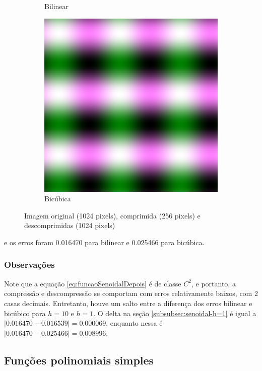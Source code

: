 \documentclass{article}
\begin{document}
\begin{figure}[ht]
\begin{subfigure}{0.23\textwidth}
    \caption{Bilinear}
  \end{subfigure}%
  \hfill
  \begin{subfigure}{0.23\textwidth}
    \centering
    \includegraphics[width=\textwidth]{senoidal/h-10/decompressed-bicubica.png}
    \caption{Bicúbica}
  \end{subfigure}
  \caption{Imagem original (1024 pixels), comprimida (256 pixels) e descomprimidas (1024 pixels)}
\end{figure}

e os erros foram 0.016470 para bilinear e 0.025466 para bicúbica.
\subsubsection{Observações}

Note que a equação \ref{eq:funcaoSenoidalDepois} é de classe $C^2$,
e portanto, a compressão e descompressão se comportam com erros relativamente
baixos, com 2 casas decimais.
Entretanto,  houve um salto entre a diferença dos erros bilinear e bicúbico
para $h=10$ e $h=1$. O delta na seção \ref{subsubsec:senoidal-h=1} é igual a 
$|0.016470 - 0.016539| = 0.000069$, enquanto nessa é $|0.016470 - 0.025466|
= 0.008996$.


\subsection{Funções polinomiais simples}
\end{document}
